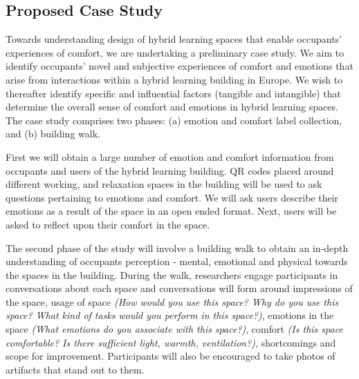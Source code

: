 \documentclass[acmconf, anonymous, review]{acmart}
\begin{document}
\subsection{Proposed Case Study} 
Towards understanding design of hybrid learning spaces that enable occupants' experiences of comfort, we are undertaking a preliminary case study. We aim to identify occupants' novel and subjective experiences of comfort and emotions that arise from interactions within a hybrid learning building in Europe. We wish to thereafter identify specific and influential factors (tangible and intangible) that determine the overall sense of comfort and emotions in hybrid learning spaces. The case study comprises two phases: (a) emotion and comfort label collection, and (b) building walk.

First we will obtain a large number of emotion and comfort information from occupants and users of the hybrid learning building. QR codes placed around different working, and relaxation spaces in the building will be used to ask questions pertaining to emotions and comfort. We will ask users describe their emotions as a result of the space in an open ended format. Next, users will be asked to reflect upon their comfort in the space.

The second phase of the study will involve a building walk to obtain an in-depth understanding of occupants perception - mental, emotional and physical towards the spaces in the building. During the walk, researchers engage participants in conversations about each space and conversations will form around impressions of the space, usage of space \textit{(How would you use this space? Why do you use this space? What kind of tasks would you perform in this space?)}, emotions in the space \textit{(What emotions do you associate with this space?)}, comfort \textit{(Is this space comfortable?	Is there sufficient light, warmth, ventilation?)}, shortcomings and scope for improvement. Participants will also be encouraged to take photos of artifacts that stand out to them. 

\end{document}
